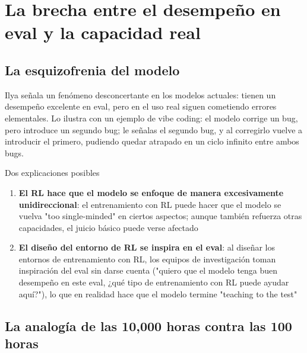 \section{La brecha entre el desempeño en eval y la capacidad real}

\subsection{La esquizofrenia del modelo}

Ilya señala un fenómeno desconcertante en los modelos actuales: tienen un desempeño excelente en eval, pero en el uso real siguen cometiendo errores elementales. Lo ilustra con un ejemplo de vibe coding: el modelo corrige un bug, pero introduce un segundo bug; le señalas el segundo bug, y al corregirlo vuelve a introducir el primero, pudiendo quedar atrapado en un ciclo infinito entre ambos bugs.

\begin{importantbox}{Dos explicaciones posibles}
\begin{enumerate}
    \item \textbf{El RL hace que el modelo se enfoque de manera excesivamente unidireccional}: el entrenamiento con RL puede hacer que el modelo se vuelva "too single-minded" en ciertos aspectos; aunque también refuerza otras capacidades, el juicio básico puede verse afectado
    \item \textbf{El diseño del entorno de RL se inspira en el eval}: al diseñar los entornos de entrenamiento con RL, los equipos de investigación toman inspiración del eval sin darse cuenta ("quiero que el modelo tenga buen desempeño en este eval, ¿qué tipo de entrenamiento con RL puede ayudar aquí?"), lo que en realidad hace que el modelo termine "teaching to the test"
\end{enumerate}
\end{importantbox}

\subsection{La analogía de las 10,000 horas contra las 100 horas}

